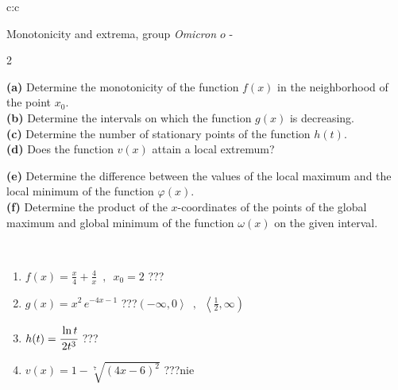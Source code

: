 \documentclass[10pt]{report}
\newcommand\omicron{o}
\begin{document}
\begin{tabular}{c:c}
\begin{minipage}[c][104.5mm][t]{0.5\linewidth}
\begin{center}
\vspace{5mm}
{\huge Monotonicity and extrema, group \textit{Omicron $\omicron$} -}\\[5mm]
\begin{minipage}{0.95\linewidth}
\begin{center}
{\small \begin{multicols}{2} \raggedright
\textbf{(a)} Determine the monotonicity of the function \(f(x)\) in the neighborhood of the point \(x_0\). \\[1mm]
\textbf{(b)} Determine the intervals on which the function \(g(x)\) is decreasing. \\[1mm]
\textbf{(c)} Determine the number of stationary points of the function \(h(t)\). \\[1mm]
\textbf{(d)} Does the function \(v(x)\) attain a local extremum? \par \columnbreak
\textbf{(e)} Determine the difference between the values of the local maximum and the local minimum of the function \(\varphi(x)\). \\[1mm]
\textbf{(f)} Determine the product of the \(x\)-coordinates of the points of the global maximum and global minimum of the function \(\omega(x)\) on the given interval. \\[1mm]
\end{multicols}
}
\end{center}
\end{minipage}
\\[1mm]
\begin{minipage}{0.79\linewidth}
\begin{center}
\begin{varwidth}{\linewidth}
\setlength{\itemsep}{0pt}
\begin{enumerate}
\normalsize
\item $f(x)=\frac{x}{4}+\frac{4}{x} \enspace , \enspace x_0=2$\quad \dotfill\; ???\;\dotfill \quad {}
\item $g(x)=x^2\, e^{-4x-1}$\quad \dotfill\; ???\;\dotfill \quad $\left(-\infty , 0\right\rangle\enspace , \enspace \left\langle\frac{1}{2} , \infty\right)$
\item $h(t)=\cfrac{\ln t}{2t^3}$\quad \dotfill\; ???\;\dotfill {}
\item $v(x)=1-\sqrt[7]{(4x-6)^2}$\quad \dotfill\; ???\;\dotfill \quad $\text{nie}$

\end{enumerate}
\end{varwidth}
\end{center}
\end{minipage}
\end{center}
\end{minipage}
\end{tabular}
\end{document}
